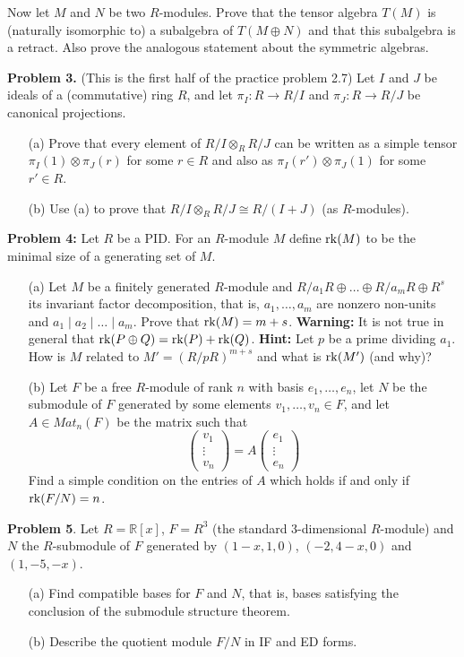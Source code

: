 \documentclass[12pt]{article}
\begin{document}
Now let $M$ and $N$ be two $R$-modules. Prove that the tensor algebra
$T(M)$ is (naturally isomorphic to) a subalgebra of $T(M\oplus N)$ and that this subalgebra is a retract. Also prove the analogous statement about the symmetric algebras.

\skv
{\bf Problem 3.} (This is the first half of the practice problem 2.7) Let $I$ and $J$ be ideals of a (commutative) ring $R$, and let $\pi_I:R\to R/I$ and $\pi_J:R\to R/J$ be canonical projections.
\begin{itemize}
\item[(a)] Prove that every element of $R/I\otimes_R R/J$ can be written as
a simple tensor $\pi_I(1)\otimes \pi_J(r)$ for some $r\in R$
and also as $\pi_I(r')\otimes \pi_J(1)$ for some $r'\in R$.
\item[(b)] Use (a) to prove that $R/I\otimes_R R/J\cong R/(I+J)$ (as $R$-modules).
\end{itemize}

{\bf Problem 4:} \rm Let $R$ be a PID. For an $R$-module $M$ define
${\rm rk}(M)$ to be the minimal size of a generating set of $M$.
\begin{itemize}
\item[(a)] Let $M$ be a finitely generated $R$-module and
$R/a_1R\oplus \ldots \oplus R/a_mR\oplus R^s$ its invariant factor
decomposition, that is, $a_1,\ldots, a_m$ are nonzero 
non-units and $a_1\mid a_2\mid\ldots\mid a_m$. Prove that
${\rm rk}(M)=m+s$. {\bf Warning:} It is not true in general that
${\rm rk}(P\oplus Q)={\rm rk}(P)+{\rm rk}(Q)$. {\bf Hint:} Let $p$ be a prime
dividing $a_1$. How is $M$ related to $M'=(R/pR)^{m+s}$
and what is ${\rm rk}(M')$ (and why)?

\item[(b)] Let $F$ be a free $R$-module of rank $n$ with basis 
$e_1,\ldots, e_n$, let $N$ be the submodule of $F$
generated by some elements $v_1,\ldots, v_n\in F$,
and let $A\in Mat_n(F)$ be the matrix such that
$$\left(\begin{array}{c} v_1 \\ \vdots \\ v_n\end{array}\right)=
A \left(\begin{array}{c} e_1 \\ \vdots \\ e_n\end{array}\right)$$ 
Find a simple condition on the entries of $A$ which holds
if and only if ${\rm rk}(F/N)=n$.
\end{itemize}

{\bf Problem 5}. Let $R=\mathbb R[x]$, $F=R^3$ (the standard 3-dimensional $R$-module)
and $N$ the $R$-submodule of $F$
generated by $(1-x,1,0)$, $(-2,4-x,0)$ and $(1,-5,-x)$.
\begin{itemize}
\item[(a)] Find compatible bases for $F$ and $N$, that is, bases satisfying the conclusion
of the submodule structure theorem.
\item[(b)] Describe the quotient module $F/N$ in IF and ED forms.
\end{itemize}
\end{document}
